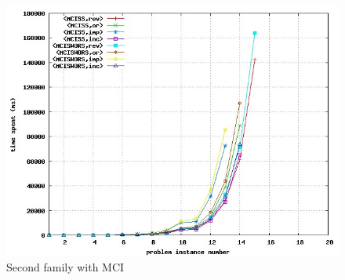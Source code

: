 \documentclass[a4paper,10pt]{book}
\begin{document}
 
\begin{figure}[h!]
\begin{center}
\includegraphics[width=.9\textwidth]{MCI_2_C.jpg}
\end{center}
\caption{Second family with MCI}
\end{figure}
\end{document}
